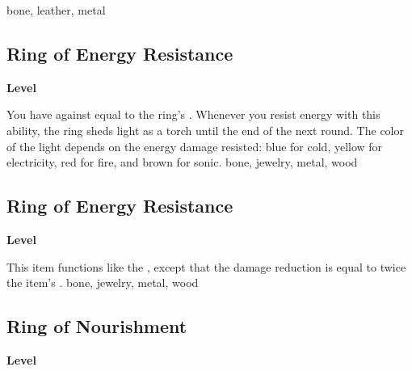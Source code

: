  
 bone, leather, metal
\begin{multicols}{2}
\lowercase{\hypertarget{item:Ring of Energy Resistance}{}}\label{item:Ring of Energy Resistance}
\hypertarget{item:Ring of Energy Resistance}{\subsection{Ring of Energy Resistance}}
\columnbreak%
\begin{flushright}
\large\textbf{ Level}
\end{flushright}
\end{multicols}
\vspace{-1.5em}  %
You have  against  equal to the ring's .
Whenever you resist energy with this ability, the ring sheds light as a torch until the end of the next round.
The color of the light depends on the energy damage resisted: blue for cold, yellow for electricity, red for fire, and brown for sonic.
 
 bone, jewelry, metal, wood
\begin{multicols}{2}
\lowercase{\hypertarget{item:Ring of Energy Resistance}{}}\label{item:Ring of Energy Resistance}
\hypertarget{item:Ring of Energy Resistance}{\subsection{Ring of Energy Resistance}}
\columnbreak%
\begin{flushright}
\large\textbf{ Level}
\end{flushright}
\end{multicols}
\vspace{-1.5em}  %
This item functions like the , except that the damage reduction is equal to twice the item's .
 
 bone, jewelry, metal, wood
\begin{multicols}{2}
\lowercase{\hypertarget{item:Ring of Nourishment}{}}\label{item:Ring of Nourishment}
\hypertarget{item:Ring of Nourishment}{\subsection{Ring of Nourishment}}
\columnbreak%
\begin{flushright}
\large\textbf{ Level}
\end{flushright}
\end{multicols}
